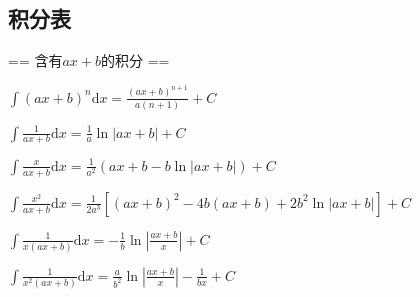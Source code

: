 \subsection{积分表}


== 含有$ax+b$的积分 ==\par

$\int (ax+b)^n\mbox{d}x=\frac{(ax+b)^{n+1}}{a(n+1)}+C$\par
$\int\frac{1}{ax+b}\mbox{d}x=\frac{1}{a}\ln \left | ax+b\right|+C$\par
$\int\frac{x}{ax+b}\mbox{d}x=\frac{1}{a^2}(ax+b-b\ln\left |ax+b \right|) +C$\par
$\int\frac{x^2}{ax+b}\mbox{d}x=\frac{1}{2a^3} \left[(ax+b)^2-4b(ax+b)+2b^2 \ln\left |ax+b\right| \right]+C$\par
$\int\frac{1}{x(ax+b)}\mbox{d}x = -\frac{1}{b}\ln\left | \frac{ax+b}{x}\right |+C$\par
$\int\frac{1}{x^2(ax+b)}\mbox{d}x=\frac{a}{b^2}\ln\left |\frac{ax+b}{x}\right |-\frac{1}{bx}+C$\par

